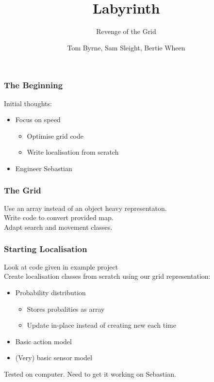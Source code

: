 \documentclass{beamer}
\title{Labyrinth}
\subtitle{Revenge of the Grid}
\author{Tom Byrne, Sam Sleight, Bertie Wheen}
\begin{document}
\frame{\titlepage}

\begin{frame}
    \frametitle{The Beginning}
    Initial thoughts: \pause
    \begin{itemize}
        \item Focus on speed \pause
            \begin{itemize}
                \item Optimise grid code \pause
                \item Write localisation from scratch \pause
            \end{itemize}
        \item Engineer Sebastian
    \end{itemize}
\end{frame}

\begin{frame}
    \frametitle{The Grid}
    Use an array instead of an object heavy representaton. \\ \pause
    Write code to convert provided map. \\ \pause
    Adapt search and movement classes.
\end{frame}

\begin{frame}
    \frametitle{Starting Localisation}
    Look at code given in example project \\ \pause
    Create localisation classes from scratch using our grid representation: \pause
    \begin{itemize}
        \item Probability distribution
            \begin{itemize}
                \item Stores probalities as array \pause
                \item Update in-place instead of creating new each time \pause
            \end{itemize}
        \item Basic action model \pause
        \item (Very) basic sensor model \pause
    \end{itemize}
    Tested on computer. Need to get it working on Sebastian.
\end{frame}
\end{document}
